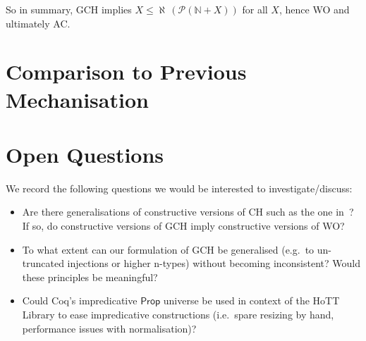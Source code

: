 \documentclass{easychair}
\newcommand{\nat}{\mathbb{N}}
\newcommand{\pow}{\mathcal{P}}
\begin{document}
So in summary, GCH implies $X\le \aleph\,(\pow(\nat + X))$ for all $X$, hence WO and ultimately AC.


\section{Comparison to Previous Mechanisation}




\section{Open Questions}

We record the following questions we would be interested to investigate/discuss:
\begin{itemize}[noitemsep]
	\item
	Are there generalisations of constructive versions of CH such as the one in~\cite{gielen1981continuum}?
	If so, do constructive versions of GCH imply constructive versions of WO?
	\item
	To what extent can our formulation of GCH be generalised (e.g.\ to un-truncated injections or higher n-types) without becoming inconsistent? Would these principles be meaningful?
	\item
	Could Coq's impredicative $\mathsf{Prop}$ universe be used in context of the HoTT Library to ease impredicative constructions (i.e.\ spare resizing by hand, performance issues with normalisation)?
\end{itemize}



\scriptsize{}
\vspace{-20em}
\end{document}
